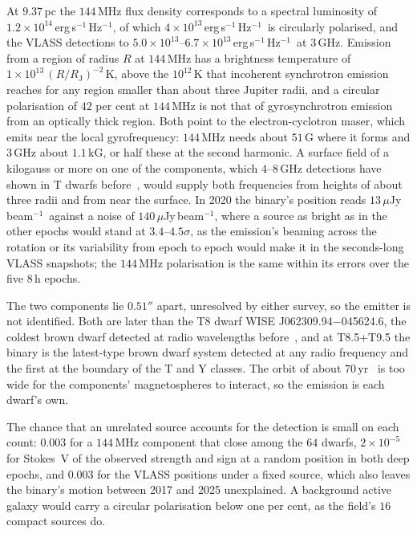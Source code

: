 \documentclass[3p,11pt]{elsarticle}
\newcommand{\uJyb}{$\mu$Jy\,beam$^{-1}$}
\newcommand{\lnu}{erg\,s$^{-1}$\,Hz$^{-1}$}
\newcommand{\sci}[2]{#1\times10^{#2}}
\begin{document}
At $9.37$\,pc the $144$\,MHz flux density corresponds to a spectral luminosity of
$\sci{1.2}{14}$\,\lnu, of which $\sci{4}{13}$\,\lnu\ is circularly polarised, and the
VLASS detections to $\sci{5.0}{13}$--$\sci{6.7}{13}$\,\lnu\ at $3$\,GHz. Emission from a
region of radius $R$ at $144$\,MHz has a brightness temperature of
$\sci{1}{13}\,(R/R_\mathrm{J})^{-2}$\,K, above the $10^{12}$\,K that incoherent
synchrotron emission reaches for any region smaller than about three Jupiter radii, and a
circular polarisation of $42$ per cent at $144$\,MHz is not that of gyrosynchrotron
emission from an optically thick region. Both point to the electron-cyclotron maser,
which emits near the local gyrofrequency: $144$\,MHz needs about $51$\,G where it forms
and $3$\,GHz about $1.1$\,kG, or half these at the second harmonic. A surface field of a
kilogauss or more on one of the components, which $4$--$8$\,GHz detections have shown
in T dwarfs before~\cite{Kao2016}, would supply both frequencies from heights of about
three radii and from near the surface. In 2020 the binary's position reads
$13$\,\uJyb\ against a noise of $140$\,\uJyb, where a source as bright as in the other
epochs would stand at $3.4$--$4.5\sigma$, as the emission's beaming across the rotation
or its variability from epoch to epoch would make it in the seconds-long VLASS
snapshots; the $144$\,MHz polarisation is the same within its errors over the five
$8$\,h epochs.

The two components lie $0.51''$ apart, unresolved by either survey, so the emitter is
not identified. Both are later than the T8 dwarf WISE J062309.94$-$045624.6, the
coldest brown dwarf detected at radio wavelengths before~\cite{Rose2023}, and at
T8.5+T9.5 the binary is the latest-type brown dwarf system detected at any radio
frequency and the first at the boundary of the T and Y classes. The orbit of about
$70$\,yr~\cite{Gelino2011} is too wide for the components' magnetospheres to interact,
so the emission is each dwarf's own.

The chance that an unrelated source accounts for the detection is small on each count:
$0.003$ for a $144$\,MHz component that close among the $64$ dwarfs, $\sci{2}{-5}$ for
Stokes~V of the observed strength and sign at a random position in both deep epochs, and
$0.003$ for the VLASS positions under a fixed source, which also leaves the binary's
motion between 2017 and 2025 unexplained. A background active galaxy would carry a
circular polarisation below one per cent, as the field's $16$ compact sources do.
\end{document}
